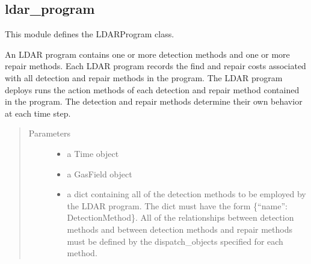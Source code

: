 \documentclass[letterpaper,10pt,english]{sphinxmanual}
\begin{document}
\subsection{ldar\_program}
\label{\detokenize{index:module-feast.DetectionModules.ldar_program}}\label{\detokenize{index:ldar-program}}
This module defines the LDARProgram class.

\begin{fulllineitems}
\label{\detokenize{index:feast.DetectionModules.ldar_program.LDARProgram}}
An LDAR program contains one or more detection methods and one or more repair methods. Each LDAR program records
the find and repair costs associated with all detection and repair methods in the program. The LDAR program
deploys runs the action methods of each detection and repair method contained in the program. The detection and
repair methods determine their own behavior at each time step.
\begin{quote}\begin{description}
\item[{Parameters}] \leavevmode\begin{itemize}
\item {} 
 \textendash{} a Time object

\item {} 
 \textendash{} a GasField object

\item {} 
 \textendash{} a dict containing all of the detection methods to be employed by the LDAR program. The dict
must have the form \{“name”: DetectionMethod\}. All of the relationships between detection methods and between
detection methods and repair methods must be defined by the dispatch\_objects specified for each method.

\end{itemize}

\end{description}\end{quote}


\end{fulllineitems}
\end{document}
